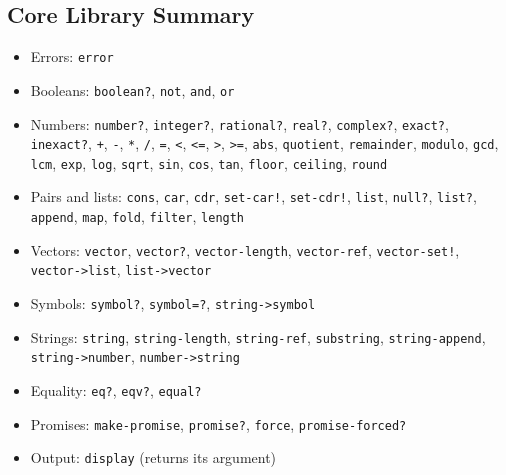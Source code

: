 \subsection*{Core Library Summary}

\begin{itemize}
\item Errors: \texttt{error}
\item Booleans: \texttt{boolean?}, \texttt{not}, \texttt{and}, \texttt{or}
\item Numbers: \texttt{number?}, \texttt{integer?}, \texttt{rational?}, \texttt{real?},
  \texttt{complex?}, \texttt{exact?}, \texttt{inexact?}, \texttt{+}, \texttt{-},
  \texttt{*}, \texttt{/}, \texttt{=}, \texttt{<}, \texttt{<=}, \texttt{>}, \texttt{>=},
  \texttt{abs}, \texttt{quotient}, \texttt{remainder}, \texttt{modulo}, \texttt{gcd},
  \texttt{lcm}, \texttt{exp}, \texttt{log}, \texttt{sqrt}, \texttt{sin}, \texttt{cos},
  \texttt{tan}, \texttt{floor}, \texttt{ceiling}, \texttt{round}
\item Pairs and lists: \texttt{cons}, \texttt{car}, \texttt{cdr}, \texttt{set-car!},
  \texttt{set-cdr!}, \texttt{list}, \texttt{null?}, \texttt{list?}, \texttt{append},
  \texttt{map}, \texttt{fold}, \texttt{filter}, \texttt{length}
\item Vectors: \texttt{vector}, \texttt{vector?}, \texttt{vector-length},
  \texttt{vector-ref}, \texttt{vector-set!}, \texttt{vector->list}, \texttt{list->vector}
\item Symbols: \texttt{symbol?}, \texttt{symbol=?}, \texttt{string->symbol}
\item Strings: \texttt{string}, \texttt{string-length}, \texttt{string-ref},
  \texttt{substring}, \texttt{string-append}, \texttt{string->number}, \texttt{number->string}
\item Equality: \texttt{eq?}, \texttt{eqv?}, \texttt{equal?}
\item Promises: \texttt{make-promise}, \texttt{promise?}, \texttt{force},
  \texttt{promise-forced?}
\item Output: \texttt{display} (returns its argument)
\end{itemize}

